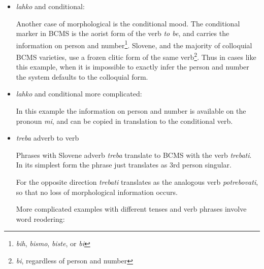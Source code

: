 \begin{itemize}
\item \emph{lahko} and conditional:

Another case of morphological is the conditional
mood. The conditional marker in BCMS is the aorist form of the verb
\emph{to be}, and carries the information on person and
number\footnote{\emph{bih}, \emph{bismo}, \emph{biste}, or \emph{bi}}. Slovene, and the majority of colloquial BCMS varieties, use
a frozen clitic form of the same verb\footnote{\emph{bi}, regardless of person and
number}. Thus in cases like this example, when it is impossible to
exactly infer the person and number the system defaults to the
colloquial form.

\item \emph{lahko} and conditional more complicated:

In this example the information on person and number is available
on the pronoun \emph{mi}, and can be copied in translation to the
conditional verb.

\item \emph{treba} adverb to verb

Phrases with Slovene adverb \emph{treba} translate to BCMS with the
verb \emph{trebati}. In its simplest form the phrase just translates
as 3rd person singular.

For the opposite direction \emph{trebati} translates as the analogous
verb \emph{potrebovati}, so that no loss of morphological information occurs.


More complicated examples with different tenses and verb phrases involve word reodering:


\end{itemize}
